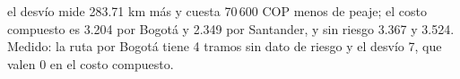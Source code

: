 {el desvío mide 283.71 km más y cuesta 70\,600 COP menos de peaje; el costo compuesto es 3.204 por Bogotá y 2.349 por Santander, y sin riesgo 3.367 y 3.524.}
{Medido: la ruta por Bogotá tiene 4 tramos sin dato de riesgo y el desvío 7, que valen 0 en el costo compuesto.}

